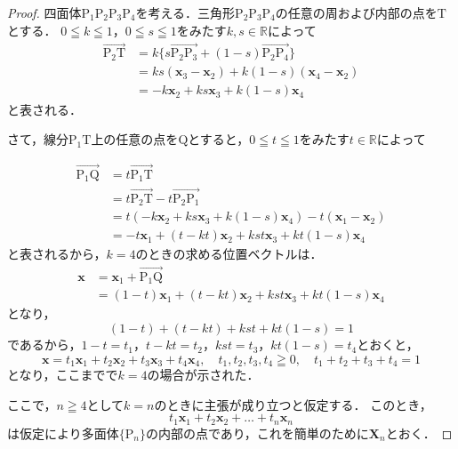 \documentclass[a4paper,10pt,fleqn]{ltjsarticle}
\begin{document}
\begin{leftbar}
  \begin{proof}
    四面体$\mathrm{P_1 P_2 P_3 P_4}$を考える．三角形$\mathrm{P_2 P_3 P_4}$の任意の周および内部の点を$\mathrm{T}$とする．
    $0 \leqq k \leqq 1$，$0 \leqq s \leqq 1$をみたす$k,s \in \mathbb{R}$によって
    \begin{align*}
      \overrightarrow{\mathrm{P_2 T}} & = k \{ s \overrightarrow{\mathrm{P_2 P_3}} + (1-s) \overrightarrow{\mathrm{P_2 P_4}} \} \\
                                      & = ks(\bm{x}_3 -\bm{x}_2) + k(1-s) (\bm{x}_4-\bm{x}_2)                                   \\
                                      & = -k\bm{x}_2 + ks \bm{x}_3 + k(1-s) \bm{x}_4
    \end{align*}
    と表される．

    さて，線分$\mathrm{P_1 T}$上の任意の点を$\mathrm{Q}$とすると，$0 \leqq t \leqq 1$をみたす$t \in \mathbb{R}$によって

    \begin{align*}
      \overrightarrow{\mathrm{P_1 Q}} & =t \overrightarrow{\mathrm{P_1 T}}                                      \\
                                      & = t\overrightarrow{\mathrm{P_2 T}} - t\overrightarrow{\mathrm{P_2 P_1}} \\
                                      & = t (-k\bm{x}_2 + ks \bm{x}_3 + k(1-s) \bm{x}_4)-t(\bm{x}_1 -\bm{x}_2)  \\
                                      & = -t\bm{x}_1 +(t-kt) \bm{x}_2 + kst \bm{x}_3 +kt(1-s) \bm{x}_4
    \end{align*}
    と表されるから，$k=4$のときの求める位置ベクトルは．
    \begin{align*}
      \bm{x} & = \bm{x}_1 + \overrightarrow{\mathrm{P_1 Q}}                     \\
             & = (1-t) \bm{x}_1 +(t-kt)\bm{x}_2 +kst \bm{x}_3 +kt(1-s) \bm{x}_4
    \end{align*}
    となり，
    \[
      (1-t)+ (t-kt)+kst + kt(1-s)=1
    \]
    であるから，$1-t = t_1$，$t-kt =t_2$，$kst = t_3$，$kt(1-s)=t_4$とおくと，
    \[
      \bm{x}= t_1 \bm{x}_1 + t_2 \bm{x}_2 + t_3 \bm{x}_3 + t_4 \bm{x}_4 , \quad t_1, t_2 ,t_3 , t_4 \geqq 0 ,\quad  t_1 +t_2 + t_3 + t_4 =1
    \]
    となり，ここまでで$k=4$の場合が示された．

    ここで，$n \geqq 4$として$k=n$のときに主張が成り立つと仮定する．
    このとき，
    \[
      t_1 \bm{x}_1 + t_2 \bm{x}_2+\dots+ t_n \bm{x}_n
    \]
    は仮定により多面体$\{ \mathrm{P}_n \}$の内部の点であり，これを簡単のために$\bm{X}_n$とおく．


\end{proof}
\end{leftbar}
\end{document}
